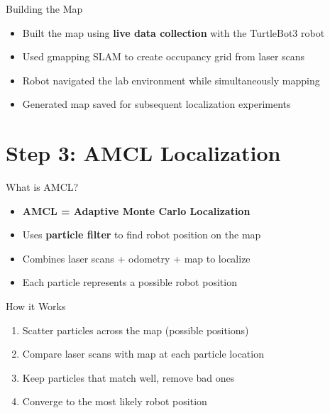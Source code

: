 \documentclass[10pt]{beamer}
\begin{document}
\begin{frame}{Building the Map}
\begin{itemize}
    \item Built the map using \textbf{live data collection} with the TurtleBot3 robot
    \item Used gmapping SLAM to create occupancy grid from laser scans
    \item Robot navigated the lab environment while simultaneously mapping
    \item Generated map saved for subsequent localization experiments
\end{itemize}

\begin{center}
\end{center}
\end{frame}

\section{Step 3: AMCL Localization}

\begin{frame}{What is AMCL?}
\begin{itemize}
    \item \textbf{AMCL = Adaptive Monte Carlo Localization}
    \item Uses \textbf{particle filter} to find robot position on the map
    \item Combines laser scans + odometry + map to localize
    \item Each particle represents a possible robot position
\end{itemize}

\vspace{5mm}
\begin{block}{How it Works}
\begin{enumerate}
    \item Scatter particles across the map (possible positions)
    \item Compare laser scans with map at each particle location  
    \item Keep particles that match well, remove bad ones
    \item Converge to the most likely robot position
\end{enumerate}
\end{block}
\end{frame}
\end{document}
